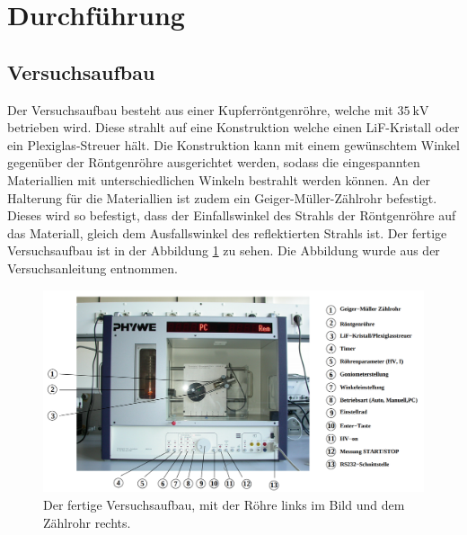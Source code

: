 \section{Durchführung}
\label{sec:Durchführung}
\subsection{Versuchsaufbau}
Der Versuchsaufbau besteht aus einer Kupferröntgenröhre, welche mit $\SI{35}{\kilo\volt}$ betrieben wird.
Diese strahlt auf eine Konstruktion welche einen LiF-Kristall oder ein Plexiglas-Streuer hält.
Die Konstruktion kann mit einem gewünschtem Winkel gegenüber der Röntgenröhre ausgerichtet werden, sodass die eingespannten Materiallien mit unterschiedlichen Winkeln bestrahlt werden können.
An der Halterung für die Materiallien ist zudem ein Geiger-Müller-Zählrohr befestigt.
Dieses wird so befestigt, dass der Einfallswinkel des Strahls der Röntgenröhre auf das Materiall, gleich dem Ausfallswinkel des reflektierten Strahls ist.
Der fertige Versuchsaufbau ist in der Abbildung \ref{fig:aufbau} zu sehen.
Die Abbildung wurde aus der Versuchsanleitung \cite{anleitung} entnommen.

\begin{figure}
    \centering
    \includegraphics[width=\textwidth]{content/data/Roehre.png}
    \caption{Der fertige Versuchsaufbau, mit der Röhre links im Bild und dem Zählrohr rechts.}
    \label{fig:aufbau}
\end{figure}

